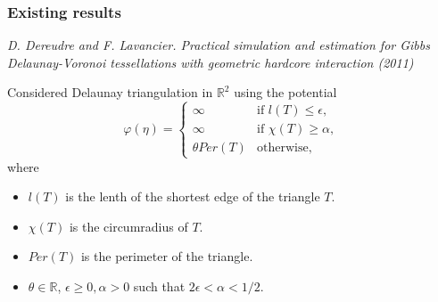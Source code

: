 \documentclass[c, 10pt]{beamer}
\begin{document}
\begin{frame}\frametitle{Existing results}
	\textit{D. Dereudre and F. Lavancier. Practical simulation and estimation for Gibbs Delaunay-Voronoi tessellations with geometric hardcore interaction (2011)}

	Considered Delaunay triangulation in $\mathbb R^2$ using the potential
\begin{equation*}
	\varphi(\eta) = 
\left\{
    \begin{array}{ll}
        \infty & \mbox{if } l(T)\leq \epsilon, \\
        \infty & \mbox{if } \chi(T)\geq \alpha, \\
        \theta Per(T) & \mbox{otherwise, }
    \end{array}
\right. 
\end{equation*}
where
\begin{itemize}
\item $l(T)$ is the lenth of the shortest edge of the triangle $T$.
\item $\chi(T)$ is the circumradius of $T$.
\item $Per(T)$ is the perimeter of the triangle.
\item $\theta \in \mathbb R$, $\epsilon \geq 0, \alpha > 0$ such that $2\epsilon < \alpha < 1/2$.
\end{itemize}


\end{frame}
\end{document}
